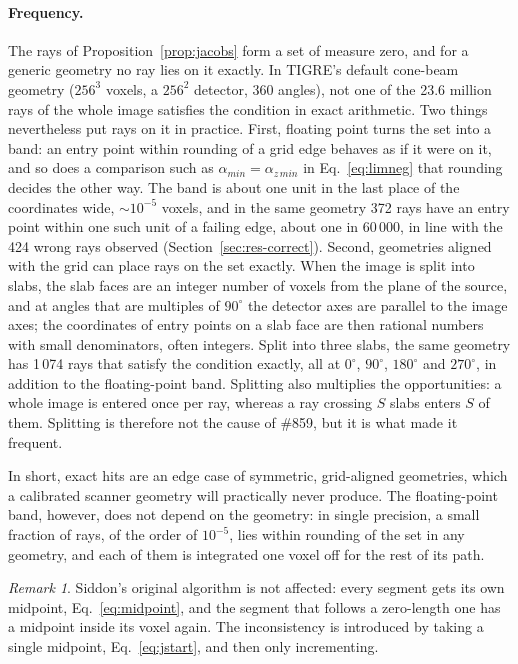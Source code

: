 \documentclass[11pt,a4paper]{article}
\theoremstyle{remark}
\newtheorem*{remark}{Remark}
\begin{document}
\paragraph{Frequency.} The rays of Proposition~\ref{prop:jacobs} form a set of measure zero, and for a
generic geometry no ray lies on it exactly. In TIGRE's default cone-beam geometry ($256^3$ voxels, a
$256^2$ detector, 360 angles), not one of the 23.6 million rays of the whole image satisfies the condition
in exact arithmetic. Two things nevertheless put rays on it in practice. First, floating point turns the set
into a band: an entry point within rounding of a grid edge behaves as if it were on it, and so does a
comparison such as $\alpha_{min}=\alpha_{z\,min}$ in Eq.~\eqref{eq:limneg} that rounding decides the other
way. The band is about one unit in the last place of the coordinates wide, $\sim10^{-5}$ voxels, and in the
same geometry 372 rays have an entry point within one such unit of a failing edge, about one in 60\,000, in
line with the 424 wrong rays observed (Section~\ref{sec:res-correct}). Second, geometries aligned with the
grid can place rays on the set exactly. When the image is split into slabs, the slab faces are an integer
number of voxels from the plane of the source, and at angles that are multiples of $90^\circ$ the detector
axes are parallel to the image axes; the coordinates of entry points on a slab face are then rational
numbers with small denominators, often integers. Split into three slabs, the same geometry has 1\,074 rays
that satisfy the condition exactly, all at $0^\circ$, $90^\circ$, $180^\circ$ and $270^\circ$, in addition to
the floating-point band. Splitting also multiplies the opportunities: a whole image is entered once per ray,
whereas a ray crossing $S$ slabs enters $S$ of them. Splitting is therefore not the cause of \#859, but it is
what made it frequent.

In short, exact hits are an edge case of symmetric, grid-aligned geometries, which a calibrated scanner
geometry will practically never produce. The floating-point band, however, does not depend on the geometry:
in single precision, a small fraction of rays, of the order of $10^{-5}$, lies within rounding of the set in
any geometry, and each of them is integrated one voxel off for the rest of its path.

\begin{remark}
Siddon's original algorithm is not affected: every segment gets its own midpoint,
Eq.~\eqref{eq:midpoint}, and the segment that follows a zero-length one has a midpoint inside its voxel
again. The inconsistency is introduced by taking a single midpoint, Eq.~\eqref{eq:jstart}, and then only
incrementing.
\end{remark}
\end{document}
